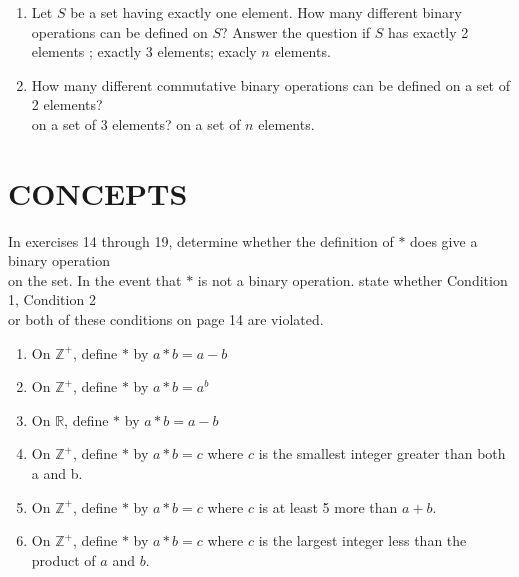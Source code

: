 \documentclass[10pt,letterpaper]{article}
\begin{document}
  \begin{enumerate}[resume]
    \item Let $S$ be a set having exactly one element. How many different binary operations
    can be defined on $S$? Answer the question if $S$ has exactly 2 elements ; exactly 3 elements; exacly $n$ elements.

    \item How many different commutative binary operations can be defined on a set of 2 elements? \\
    on a set of 3 elements? on a set of $n$ elements.
  \end{enumerate}

  \section*{CONCEPTS}

  In exercises 14 through 19, determine whether the definition of $\ast$ does give a binary operation \\
  on the set. In the event that $\ast$ is not a binary operation. state whether Condition 1, Condition 2\\
  or both of these conditions on page 14 are violated.
  \begin{enumerate}[resume]
    \item On $\mathbb{Z}^+$, define $\ast$ by $a*b=a-b$
    \item On $\mathbb{Z}^+$, define $\ast$ by $a*b=a^b$
    \item On $\mathbb{R}$, define $\ast$ by $a*b=a-b$
    \item On $\mathbb{Z}^+$, define $\ast$ by $a*b=c$ where $c$ is the smallest integer greater than both a and b.
    \item On $\mathbb{Z}^+$, define $\ast$ by $a*b=c$ where $c$ is at least 5 more than $a+b$.
    \item On $\mathbb{Z}^+$, define $\ast$ by $a*b=c$ where $c$ is the largest integer less than the product of $a$ and $b$.
  \end{enumerate}
\end{document}
